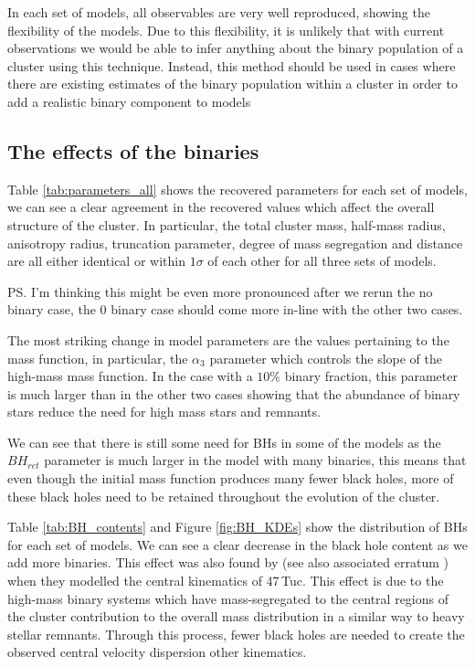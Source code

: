 In each set of models, all observables are very well reproduced, showing the flexibility of the
 models. Due to this flexibility, it is unlikely that with current observations we
would be able to infer anything about the binary population of a cluster using this technique.
Instead, this method should be used in cases where there are existing estimates of the binary
population within a cluster in order to add a realistic binary component to  models



\subsection{The effects of the binaries}


Table \ref{tab:parameters_all} shows the recovered parameters for each set of models, we can see a
clear agreement in the recovered values which affect the overall structure of the cluster. In
particular, the total cluster mass, half-mass radius, anisotropy radius, truncation parameter,
degree of mass segregation and distance are all either identical or within $1\sigma$ of each other
for all three sets of models.

\ps{I'm thinking this might be even more pronounced after we rerun the no binary case, the 0 binary
	case should come more in-line with the other two cases.}


The most striking change in model parameters are the values pertaining to the mass function, in
particular, the $\alpha_3$ parameter which controls the slope of the high-mass mass function. In the
case with a $10\%$ binary fraction, this parameter is much larger than in the other two cases
showing that the abundance of binary stars reduce the need for high mass stars and remnants.

We can see that there is still some need for BHs in some of the models as the $BH_{ret}$ parameter
is much larger in the model with many binaries, this means that even though the initial mass
function produces many fewer black holes, more of these black holes need to be retained throughout
the evolution of the cluster.

Table \ref{tab:BH_contents} and Figure \ref{fig:BH_KDEs} show the distribution of BHs for each set
of models. We can see a clear decrease in the black hole content as we add more binaries. This
effect was also found by \citet{Mann2019} (see also associated erratum \citealt{Mann2020}) when they
modelled the central kinematics of 47\,Tuc. This effect is due to the high-mass binary systems which
have mass-segregated to the central regions of the cluster contribution to the overall mass
distribution in a similar way to heavy stellar remnants. Through this process, fewer black holes are
needed to create the observed central velocity dispersion other kinematics.


